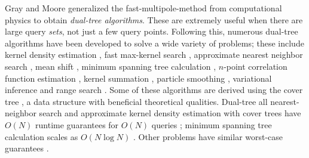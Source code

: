 \documentclass{article} %
\begin{document}
%
%
%
Gray and Moore \cite{nbody} generalized the fast-multipole-method from
computational physics to obtain {\em dual-tree algorithms}. These are extremely
useful when there are large query {\em sets}, not just a few query points.
%
Following this, numerous dual-tree algorithms have been developed to solve a
wide variety of problems; these include kernel density estimation
\cite{gray2003nonparametric}, fast max-kernel search \cite{curtin2013fast},
approximate nearest neighbor search \cite{ram2009rank}, mean shift
\cite{wang2007fast}, minimum spanning tree calculation
\cite{march2010euclidean}, $n$-point correlation function estimation
\cite{march2012fast}, kernel summation \cite{lee2006faster}, particle
smoothing \cite{klaas2006fast}, variational inference \cite{amizadeh2012variational} and range search \cite{nbody}.
%
Some of these algorithms are derived using the cover tree
\cite{langford2006}, a data structure with beneficial theoretical qualities.
Dual-tree all nearest-neighbor search and approximate kernel density estimation with cover trees have $O(N)$ runtime guarantees for $O(N)$ queries \cite{ram2009}; minimum spanning tree calculation scales as $O(N \log N)$ \cite{march2010euclidean}. Other problems have similar worst-case guarantees \cite{curtin2014dual, march2013multi}.
\end{document}
